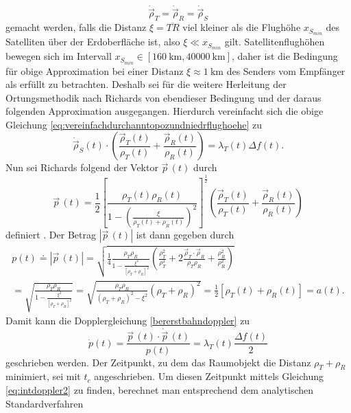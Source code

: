 \documentclass[a4paper,12pt]{article}
\numberwithin{equation}{section}
\begin{document}
\begin{equation}\label{eq:crucialannahmeniedrigeflughoehe}
\dot{\vec{\rho}}_T = \dot{\vec{\rho}}_R = \dot{\vec{\rho}}_S
\end{equation} gemacht werden, falls die Distanz $\xi = \overline{TR}$ viel kleiner als die Flughöhe $x_{S_{min}}$ des Satelliten über der Erdoberfläche ist, also $\xi \ll x_{S_{min}}$ gilt. Satellitenflughöhen bewegen sich im Intervall $x_{S_{min}} \in [\SI{160}{\kilo\meter},\SI{40000}{\kilo\meter}]$, daher ist die Bedingung für obige Approximation bei einer Distanz $\xi \approx \SI{1}{\kilo\meter}$ des Senders vom Empfänger als erfüllt zu betrachten. Deshalb sei für die weitere Herleitung der Ortungsmethodik nach Richards von ebendieser Bedingung und der daraus folgenden Approximation ausgegangen. Hierdurch vereinfacht sich die obige Gleichung \eqref{eq:vereinfachdurchanntopozundniedrflughoehe} zu \begin{equation}\label{eq:vperptop1}
\dot{\vec{\rho}}_S(t) \cdot \left(\frac{\vec{\rho}_T(t)}{\rho_T(t)}+\frac{\vec{\rho}_R(t)}{\rho_R(t)}\right) = \lambda_T(t)\Delta f(t).
\end{equation} Nun sei Richards folgend der Vektor $\vec{p}\,(t)$ durch \begin{equation}\label{eq:vperptop2}
\vec{p}\,(t) = \frac{1}{2}\left[\frac{\rho_T(t)\rho_R(t)}{1-\left(\frac{\xi}{\rho_T(t)+\rho_R(t)}\right)^2}\right]^{\frac{1}{2}}\left(\frac{\vec{\rho}_T(t)}{\rho_T(t)}+\frac{\vec{\rho}_R(t)}{\rho_R(t)}\right)
\end{equation} definiert \cite[S.1730]{Richards.1961}. Der Betrag $|\vec{p}\,(t)|$ ist dann gegeben durch \begin{gather}
p(t) \doteq |\vec{p}\,(t)| = \sqrt{\frac{1}{4}\frac{\rho_T\rho_R}{1-\frac{\xi^2}{[\rho_T+\rho_R]^2}}\left(\frac{\rho_T^2}{\rho_T^2}+2\frac{\vec{\rho}_T\cdot\vec{\rho}_R}{\rho_T\rho_R}+\frac{\rho_R^2}{\rho_R^2}\right)} \\ = \sqrt{\frac{\rho_T\rho_R}{1-\frac{\xi^2}{[\rho_T+\rho_R]^2}}} = \sqrt{\frac{\rho_T\rho_R}{(\rho_T+\rho_R)^2-\xi^2}(\rho_T+\rho_R)^2} = \frac{1}{2}[\rho_T(t)+\rho_R(t)] = a(t).
\end{gather} Damit kann die Dopplergleichung \eqref{bererstbahndoppler} zu \begin{equation}\label{eq:pdotprodzero}
\dot{p}(t) = \frac{\vec{p}\,(t)\cdot \dot{\vec{p}}\,(t)}{p(t)} = \lambda_T(t)\frac{\Delta f(t)}{2}
\end{equation} geschrieben werden. Der Zeitpunkt, zu dem das Raumobjekt die Distanz $\rho_T + \rho_R$ minimiert, sei mit $t_c$ angeschrieben. Um diesen Zeitpunkt mittels Gleichung \eqref{eq:intdoppler2} zu finden, berechnet man entsprechend dem analytischen Standardverfahren \begin{gather}

\end{gather}
\end{document}
